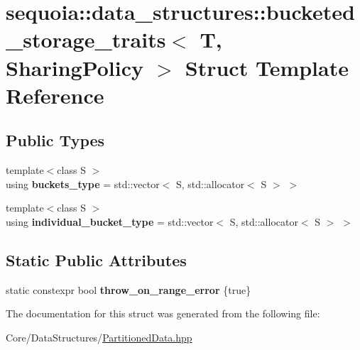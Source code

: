 \hypertarget{structsequoia_1_1data__structures_1_1bucketed__storage__traits}{}\section{sequoia\+::data\+\_\+structures\+::bucketed\+\_\+storage\+\_\+traits$<$ T, Sharing\+Policy $>$ Struct Template Reference}
\label{structsequoia_1_1data__structures_1_1bucketed__storage__traits}
\subsection*{Public Types}
\begin{DoxyCompactItemize}
\item 
\mbox{\label{structsequoia_1_1data__structures_1_1bucketed__storage__traits_a53f23bd23cf76c95690fffb9b88dc0e4}} 
{\footnotesize template$<$class S $>$ }\\using {\bfseries buckets\+\_\+type} = std\+::vector$<$ S, std\+::allocator$<$ S $>$ $>$
\item 
\mbox{\label{structsequoia_1_1data__structures_1_1bucketed__storage__traits_aa7907980b858b452c76f0017d5ae622d}} 
{\footnotesize template$<$class S $>$ }\\using {\bfseries individual\+\_\+bucket\+\_\+type} = std\+::vector$<$ S, std\+::allocator$<$ S $>$ $>$
\end{DoxyCompactItemize}
\subsection*{Static Public Attributes}
\begin{DoxyCompactItemize}
\item 
\mbox{\label{structsequoia_1_1data__structures_1_1bucketed__storage__traits_af938b84e9f5070a6f69e1c7e11aa0540}} 
static constexpr bool {\bfseries throw\+\_\+on\+\_\+range\+\_\+error} \{true\}
\end{DoxyCompactItemize}


The documentation for this struct was generated from the following file\+:\begin{DoxyCompactItemize}
\item 
Core/\+Data\+Structures/\mbox{\hyperlink{_partitioned_data_8hpp}{Partitioned\+Data.\+hpp}}\end{DoxyCompactItemize}
